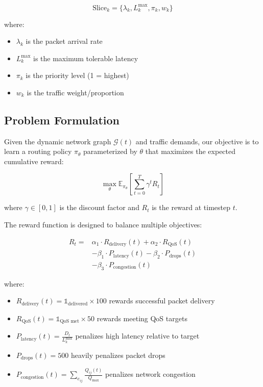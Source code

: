 \begin{equation}
\text{Slice}_k = \{\lambda_k, L_k^{\max}, \pi_k, w_k\}
\end{equation}

where:
\begin{itemize}
\item $\lambda_k$ is the packet arrival rate
\item $L_k^{\max}$ is the maximum tolerable latency
\item $\pi_k$ is the priority level (1 = highest)
\item $w_k$ is the traffic weight/proportion
\end{itemize}

\subsection{Problem Formulation}

Given the dynamic network graph $\mathcal{G}(t)$ and traffic demands, our objective is to learn a routing policy $\pi_\theta$ parameterized by $\theta$ that maximizes the expected cumulative reward:

\begin{equation}
\max_{\theta} \mathbb{E}_{\pi_\theta}\left[\sum_{t=0}^{T} \gamma^t R_t\right]
\end{equation}

where $\gamma \in [0,1]$ is the discount factor and $R_t$ is the reward at timestep $t$.

The reward function is designed to balance multiple objectives:

\begin{equation}
\begin{split}
R_t = & \alpha_1 \cdot R_{\text{delivery}}(t) + \alpha_2 \cdot R_{\text{QoS}}(t) \\
      & - \beta_1 \cdot P_{\text{latency}}(t) - \beta_2 \cdot P_{\text{drops}}(t) \\
      & - \beta_3 \cdot P_{\text{congestion}}(t)
\end{split}
\end{equation}

where:

\begin{itemize}
\item $R_{\text{delivery}}(t) = \mathbb{1}_{\text{delivered}} \times 100$ rewards successful packet delivery
\item $R_{\text{QoS}}(t) = \mathbb{1}_{\text{QoS met}} \times 50$ rewards meeting QoS targets
\item $P_{\text{latency}}(t) = \frac{D_t}{L_k^{\max}}$ penalizes high latency relative to target
\item $P_{\text{drops}}(t) = 500$ heavily penalizes packet drops
\item $P_{\text{congestion}}(t) = \sum_{e_{ij}} \frac{Q_{ij}(t)}{Q_{\max}}$ penalizes network congestion
\end{itemize}

